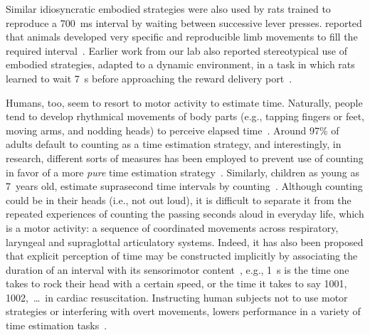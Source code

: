 Similar idiosyncratic embodied strategies were also used by rats trained to reproduce a 700~ms interval by waiting between successive lever presses.
 reported that animals developed very specific and reproducible limb movements to fill the required interval~\cite{Kawai2015}.
Earlier work from our lab also reported stereotypical use of embodied strategies, adapted to a dynamic environment, in a task in which rats learned to wait 7~s before approaching the reward delivery port~\cite{Rueda2015NN}.
\par
Humans, too, seem to resort to motor activity to estimate time.
Naturally, people tend to develop rhythmical movements of body parts (e.g., tapping fingers or feet, moving arms, and nodding heads) to perceive elapsed time~\cite{Merchant2016CurrOp}.
Around 97\% of adults default to counting as a time estimation strategy, and interestingly, in research, different sorts of measures has been employed to prevent use of counting in favor of a more \textit{pure} time estimation strategy~\cite{Rattat2012}.
Similarly, children as young as 7~years old, estimate suprasecond time intervals by counting~\cite{Wilkening1987, Rakitin1998}.
Although counting could be in their heads (i.e., not out loud), it is difficult to separate it from the repeated experiences of counting the passing seconds aloud in everyday life, which is a motor activity:
    a sequence of coordinated movements across respiratory, laryngeal and supraglottal articulatory systems.
Indeed, it has also been proposed that explicit perception of time may be constructed implicitly by associating the duration of an interval with its sensorimotor content~\cite{Coull2018}, e.g., 1~s is the time one takes to rock their head with a certain speed, or the time it takes to say 1001, 1002,~\ldots~in cardiac resuscitation.
Instructing human subjects not to use motor strategies or interfering with overt movements, lowers performance in a variety of time estimation tasks~\cite{Morillon2017PNAS, Wiener2019eNeuro, Meegan2000, Rakitin1998, Fautrelle2015PlosOne, Monier2019DevSci}.


